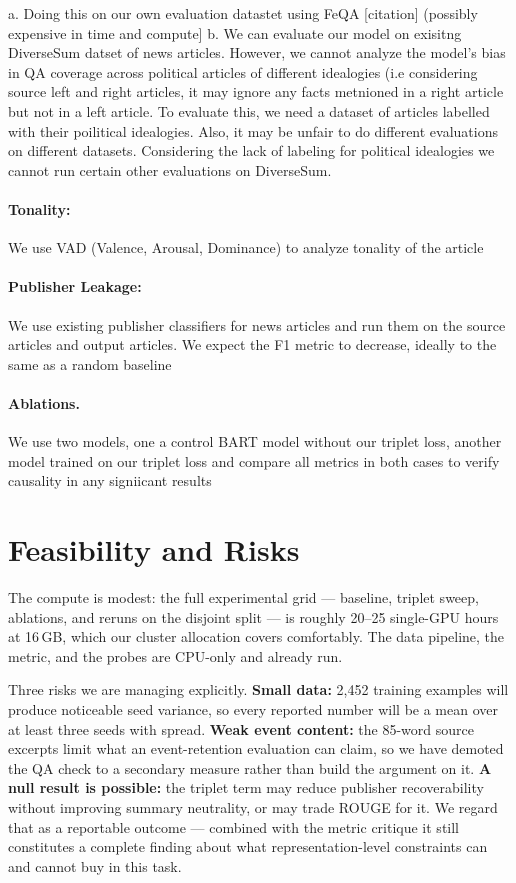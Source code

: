 \documentclass[10pt,twocolumn,a4paper]{article}
\begin{document}
a. Doing this on our own evaluation datastet using FeQA [citation] (possibly expensive in time and compute]
b. We can evaluate our model on exisitng DiverseSum datset of news articles. However, we cannot analyze the model's bias in QA coverage across political articles of different idealogies (i.e considering source left and right articles, it may ignore any facts metnioned in a right article but not in a left article. To evaluate this, we need a dataset of articles labelled with their poilitical idealogies. Also, it may be unfair to do different evaluations on different datasets. Considering the lack of labeling for political idealogies we cannot run certain other evaluations on DiverseSum.

\paragraph{Tonality:} We use VAD (Valence, Arousal, Dominance) to analyze tonality of the article

\paragraph{Publisher Leakage:} We use existing publisher classifiers for news articles and run them on the source articles and output articles. We expect the F1 metric to decrease, ideally to the same as a random baseline

\paragraph{Ablations.} We use two models, one a control BART model without our triplet loss, another model trained on our triplet loss and compare all metrics in both cases to verify causality in any signiicant results

\section{Feasibility and Risks}

The compute is modest: the full experimental grid --- baseline, triplet sweep,
ablations, and reruns on the disjoint split --- is roughly 20--25 single-GPU
hours at 16\,GB, which our cluster allocation covers comfortably. The data
pipeline, the metric, and the probes are CPU-only and already run.

Three risks we are managing explicitly. \textbf{Small data:} 2{,}452 training
examples will produce noticeable seed variance, so every reported number will be
a mean over at least three seeds with spread. \textbf{Weak event content:} the
85-word source excerpts limit what an event-retention evaluation can claim, so we
have demoted the QA check to a secondary measure rather than build the argument
on it. \textbf{A null result is possible:} the triplet term may reduce publisher
recoverability without improving summary neutrality, or may trade ROUGE for it.
We regard that as a reportable outcome --- combined with the metric critique it
still constitutes a complete finding about what representation-level constraints
can and cannot buy in this task.
\end{document}
